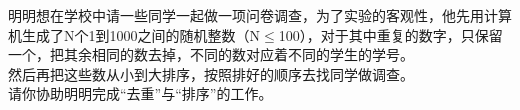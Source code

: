 明明想在学校中请一些同学一起做一项问卷调查，为了实验的客观性，他先用计算机生成了N个1到1000之间的随机整数（N$\leq$100），对于其中重复的数字，只保留一个，把其余相同的数去掉，不同的数对应着不同的学生的学号。\\
然后再把这些数从小到大排序，按照排好的顺序去找同学做调查。\\
请你协助明明完成“去重”与“排序”的工作。\\
